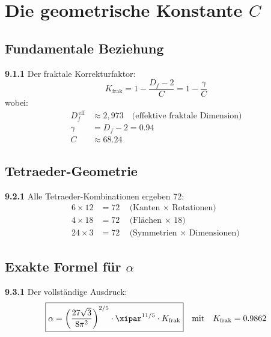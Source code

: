 \section{Die geometrische Konstante $C$}

\subsection{Fundamentale Beziehung}

\noindent \textbf{9.1.1} Der fraktale Korrekturfaktor:
\begin{equation}
	\boxed{K_{\text{frak}} = 1 - \frac{D_f - 2}{C} = 1 - \frac{\gamma}{C}}
\end{equation}
wobei:
\begin{align}
	D_f^{\,\text{eff}} &\approx 2{,}973 \quad \text{(effektive fraktale Dimension)} \\
	\gamma &= D_f - 2 = 0.94 \\
	C &\approx 68.24
\end{align}

\subsection{Tetraeder-Geometrie}

\begin{tcolorbox}[colback=yellow!5!white,colframe=red!75!black,title=Erstaunliche Entdeckung]
	\noindent \textbf{9.2.1} Alle Tetraeder-Kombinationen ergeben 72:
	\begin{align}
		6 \times 12 &= 72 \quad \text{(Kanten $\times$ Rotationen)} \\
		4 \times 18 &= 72 \quad \text{(Flächen $\times$ 18)} \\
		24 \times 3 &= 72 \quad \text{(Symmetrien $\times$ Dimensionen)}
	\end{align}
\end{tcolorbox}

\subsection{Exakte Formel für $\alpha$}

\noindent \textbf{9.3.1} Der vollständige Ausdruck:
\begin{equation}
	\boxed{\alpha = \left( \frac{27 \sqrt{3}}{8 \pi^2} \right)^{2/5} \cdot \xipar^{11/5} \cdot K_{\text{frak}}}
	\quad \text{mit} \quad K_{\text{frak}} = 0.9862
\end{equation}

